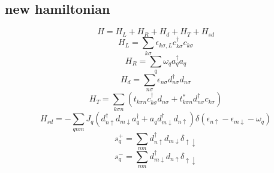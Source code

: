 \documentclass[11pt,a4paper]{book}
\begin{document}
\subsection{new hamiltonian}
\begin{equation}
H=H_{L}+H_{R}+H_{d}+H_{T}+H_{s d}
\end{equation}
\begin{equation}
H_{L}=\sum_{k \sigma} \epsilon_{k \sigma, L} c_{k \sigma}^{\dagger} c_{k \sigma}
\end{equation}
\begin{equation}
H_{R}=\sum_{q} \omega_{q} a_{q}^{\dagger} a_{q}
\end{equation}
\begin{equation}
H_{d}=\sum_{n \sigma} \epsilon_{n \sigma} d_{n \sigma}^{\dagger} d_{n \sigma}
\end{equation}
\begin{equation}
H_{T}=\sum_{k \sigma n}\left(t_{k \sigma n} c_{k \sigma}^{\dagger} d_{n \sigma}+t_{k \sigma n}^{*} d_{n \sigma}^{\dagger} c_{k \sigma}\right)
\end{equation}
\begin{equation}
H_{s d}=-\sum_{q n m} J_{q}\left(d_{n \uparrow}^{\dagger} d_{m \downarrow} a_{q}^{\dagger}+a_{q} d_{m \downarrow}^{\dagger} d_{n \uparrow}\right) \delta\left(\epsilon_{n \uparrow}-\epsilon_{m \downarrow}-\omega_{q}\right)
\end{equation}
\begin{equation}
s_{q}^{+}=\sum_{n m} d_{n \uparrow}^{\dagger} d_{m \downarrow} \delta_{\uparrow \downarrow}
\end{equation}
\begin{equation}
s_{q}^{-}=\sum_{n m} d_{m \downarrow}^{\dagger} d_{n \uparrow} \delta_{\uparrow \downarrow}
\end{equation}
\end{document}
